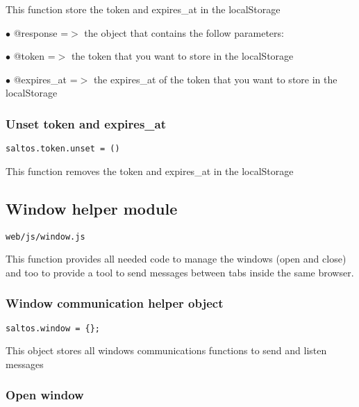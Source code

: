 \documentclass[a4paper]{article}
\begin{document}
This function store the token and expires\_at in the localStorage

\begin{compactitem}
\item[\color{myblue}$\bullet$] @response   =$>$ the object that contains the follow parameters:
\item[\color{myblue}$\bullet$] @token      =$>$ the token that you want to store in the localStorage
\item[\color{myblue}$\bullet$] @expires\_at =$>$ the expires\_at of the token that you want to store in the localStorage
\end{compactitem}

\hypertarget{toc860}{}
\subsubsection{Unset token and expires\_at}

\begin{lstlisting}
saltos.token.unset = ()
\end{lstlisting}

This function removes the token and expires\_at in the localStorage

\hypertarget{toc861}{}
\subsection{Window helper module}

\begin{lstlisting}
web/js/window.js
\end{lstlisting}

This function provides all needed code to manage the windows (open and close) and too
to provide a tool to send messages between tabs inside the same browser.

\hypertarget{toc862}{}
\subsubsection{Window communication helper object}

\begin{lstlisting}
saltos.window = {};
\end{lstlisting}

This object stores all windows communications functions to send and listen messages

\hypertarget{toc863}{}
\subsubsection{Open window}
\end{document}
